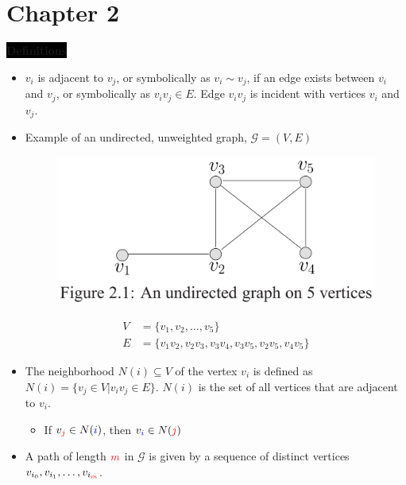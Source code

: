 \section{Chapter 2}
\colorbox{black}{\textbf{\color{white}Definitions}}
\begin{itemize}
    \item $v_i$ is {\color{red}adjacent} to $v_j$, or symbolically as $v_i \sim v_j$, if an edge exists between $v_i$ and $v_j$, or symbolically as $v_i v_j \in E$. Edge $v_i v_j$ is {\color{red}incident} with vertices $v_i$ and $v_j$.
    \item Example of an undirected, unweighted graph, $\mathcal{G}=(V,E)$
    \begin{figure}[H]
        \centering
        \includegraphics[width=0.8\linewidth]{images/Figure_2_1.png}
    \end{figure}
    \begin{align*}
        V &= \{ v_1, v_2, \dots , v_5 \} \\
        E &= \{ v_1 v_2, v_2 v_3, v_3 v_4, v_3 v_5 , v_2 v_5, v_4 v_5\}
    \end{align*}
    \item The {\color{red}neighborhood} $N(i) \subseteq V$ of the vertex $v_i$ is defined as $N(i) = \{v_j \in V | v_i v_j \in E\}$. $N(i)$ is the set of all vertices that are {\color{red}adjacent} to $v_i$.
    \begin{itemize}
        \item If $v_{\color{red}j} \in N({\color{blue}i})$, then $v_{\color{blue}i} \in N({\color{red}j})$ 
    \end{itemize}
    \item A {\color{blue}path} of length ${\color{red}m}$ in $\mathcal{G}$ is given by a sequence of distinct vertices $v_{i_0}, v_{i_1},\dots , v_{i_{\color{red}m}}$.
\end{itemize}